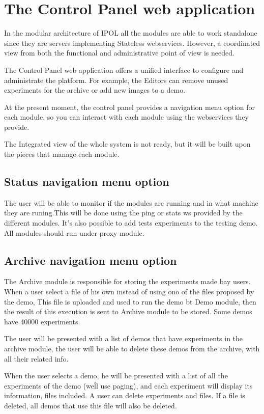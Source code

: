 \section{The Control Panel web application}
In the modular architecture of IPOL all the modules are able to work standalone since they are servers implementing Stateless webservices. However, a coordinated view from both the functional and administrative point of view is needed.

The Control Panel web application offers a unified interface to configure and administrate the platform. For example, the Editors can remove unused experiments for the archive or add new images to a demo.

At the present moment, the control panel provides a navigation menu option for each module, so you can interact with each module using the webservices they provide.

The Integrated view of the whole system is not ready, but it will be built upon the pieces that manage each module. 

\subsection{Status navigation menu option}
The user will be able to monitor if the modules are running and in what machine they are runing.This will be done using the ping or stats ws provided by the different modules.
It's also possible to add tests experiments to the testing demo.
All modules should run under proxy module.

\subsection{Archive navigation menu option}
The Archive module is responsible for storing the experiments made bay users. When a user select a file of his own instead of using ono of the files proposed by the demo, This file is uploaded and used to run the demo bt Demo module, then the result of this execution is sent to Archive module to be stored. Some demos have 40000 experiments.

The user will be presented with a list of demos that have experiments in the archive module, the user will be able to delete these demos from the archive, with all their related info.

When the user selects a demo, he will be presented with a list of all the experiments of the demo (we\'ll use paging), and each experiment will display its information, files included. A user can delete experiments and files. If a file is deleted, all demos that use this file will also be deleted.


